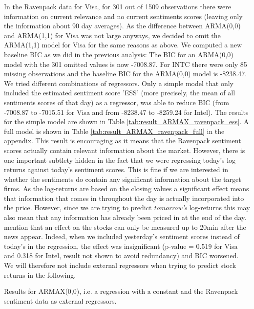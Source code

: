 In the Ravenpack data for Visa, for 301 out of 1509 observations there were information on current relevance and no current sentiments scores (leaving only the information about 90 day averages). As the difference between ARMA(0,0) and ARMA(1,1) for Visa was not large anyways, we decided to omit the ARMA(1,1) model for Visa for the same reasons as above. We computed a new baseline BIC as we did in the previous analysis: The BIC for an ARMA(0,0) model with the 301 omitted values is now -7008.87. For INTC there were only 85 missing observations and the baseline BIC for the ARMA(0,0) model is -8238.47. We tried different combinations of regressors. Only a simple model that only included the estimated sentiment score 'ESS' (more precisely, the mean of all sentiments scores of that day) as a regressor, was able to reduce BIC (from -7008.87 to -7015.51 for Visa and from -8238.47 to -8259.24 for Intel). The results for the simple model are shown in Table \ref{tab:result_ARMAX_ravenpack_ess}. A full model is shown in Table \ref{tab:result_ARMAX_ravenpack_full} in the appendix. This result is encouraging as it means that the Ravenpack sentiment scores actually contain relevant information about the market. However, there is one important subtlety hidden in the fact that we were regressing today's log returns against today's sentiment scores. This is fine if we are interested in whether the sentiments do contain any significant information about the target firms. As the log-returns are based on the closing values a significant effect means that information that comes in throughout the day is actually incorporated into the price. However, since we are trying to predict \textit{tomorrow's} log-returns this may also mean that any information has already been priced in at the end of the day.
\citet{gidofalvi2001using} mention that an effect on the stocks can only be measured up to 20min after the news appear. 
Indeed, when we included yesterday's sentiment scores instead of today's in the regression, the effect was insignificant (p-value = 0.519 for Visa and 0.318 for Intel, result not shown to avoid redundancy) and BIC worsened. We will therefore not include external regressors when trying to predict stock returns in the following. 

\begin{table}[h!]
    \centering
    \vspace{-2ex}
    \small
    
    \vspace{1ex}

    \vspace{-2ex}
    \small
    
    \caption{Results for ARMAX(0,0), i.e. a regression with a constant and the Ravenpack sentiment data as external regressors.}
    \label{tab:result_ARMAX_ravenpack_ess}
\end{table}

